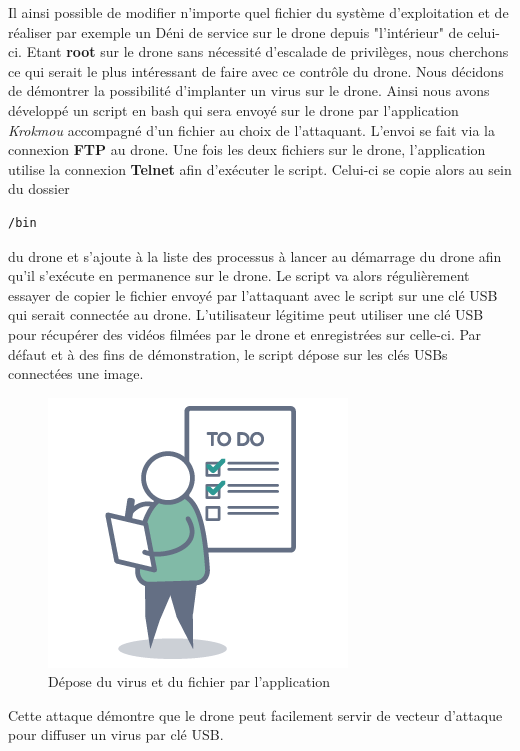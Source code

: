 Il ainsi possible de modifier n'importe quel fichier du système d'exploitation et de réaliser par exemple un Déni de service sur le drone depuis "l'intérieur" de celui-ci. Etant \textbf{root} sur le drone sans nécessité d'escalade de privilèges, nous cherchons ce qui serait le plus intéressant de faire avec ce contrôle du drone. Nous décidons de démontrer la possibilité d'implanter un virus sur le drone. Ainsi nous avons développé un script en bash qui sera envoyé sur le drone par l'application \textit{Krokmou} accompagné d'un fichier au choix de l'attaquant. L'envoi se fait via la connexion \textbf{FTP} au drone. Une fois les deux fichiers sur le drone, l'application utilise la connexion \textbf{Telnet} afin d'exécuter le script. Celui-ci se copie alors au sein du dossier \begin{verbatim}/bin\end{verbatim} du drone et s'ajoute à la liste des processus à lancer au démarrage du drone afin qu'il s'exécute en permanence sur le drone. Le script va alors régulièrement essayer de copier le fichier envoyé par l'attaquant avec le script sur une clé USB qui serait connectée au drone. L'utilisateur légitime peut utiliser une clé USB pour récupérer des vidéos filmées par le drone et enregistrées sur celle-ci. Par défaut et à des fins de démonstration, le script dépose sur les clés USBs connectées une image.

\begin{figure}[H]
  \centering
  \includegraphics[scale=0.3]{images/todo.png}
  \caption{Dépose du virus et du fichier par l'application}
\end{figure}

Cette attaque démontre que le drone peut facilement servir de vecteur d'attaque pour diffuser un virus par clé USB.
